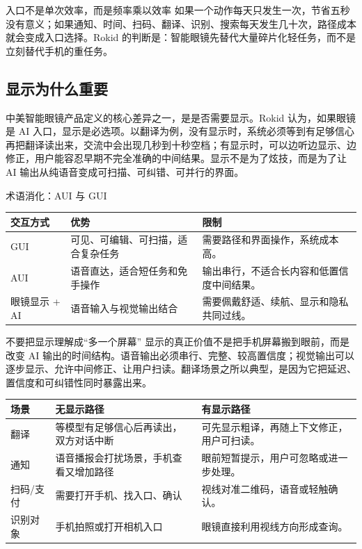 \begin{importantbox}{入口不是单次效率，而是频率乘以效率}
如果一个动作每天只发生一次，节省五秒没有意义；如果通知、时间、扫码、翻译、识别、搜索每天发生几十次，路径成本就会变成入口选择。Rokid 的判断是：智能眼镜先替代大量碎片化轻任务，而不是立刻替代手机的重任务。
\end{importantbox}

\subsection{显示为什么重要}

中美智能眼镜产品定义的核心差异之一，是是否需要显示。Rokid 认为，如果眼镜是 AI 入口，显示是必选项。以翻译为例，没有显示时，系统必须等到有足够信心再把翻译读出来，交流中会出现几秒到十秒空档；有显示时，可以边听边显示、边修正，用户能容忍早期不完全准确的中间结果。显示不是为了炫技，而是为了让 AI 输出从纯语音变成可扫描、可纠错、可并行的界面。

\begin{knowledgebox}{术语消化：AUI 与 GUI}
\noindent\begin{tabularx}{\textwidth}{p{}p{}X}
\toprule
交互方式 & 优势 & 限制 \\
\midrule
GUI & 可见、可编辑、可扫描，适合复杂任务 & 需要路径和界面操作，系统成本高。 \\
AUI & 语音直达，适合短任务和免手操作 & 输出串行，不适合长内容和低置信度中间结果。 \\
眼镜显示 + AI & 语音输入与视觉输出结合 & 需要佩戴舒适、续航、显示和隐私共同过线。 \\
\bottomrule
\end{tabularx}
\end{knowledgebox}

\begin{warningbox}{不要把显示理解成“多一个屏幕”}
显示的真正价值不是把手机屏幕搬到眼前，而是改变 AI 输出的时间结构。语音输出必须串行、完整、较高置信度；视觉输出可以逐步显示、允许中间修正、让用户扫读。翻译场景之所以典型，是因为它把延迟、置信度和可纠错性同时暴露出来。
\end{warningbox}

\noindent\begin{tabularx}{\textwidth}{p{}p{}X}
\toprule
场景 & 无显示路径 & 有显示路径 \\
\midrule
翻译 & 等模型有足够信心后再读出，双方对话中断 & 可先显示粗译，再随上下文修正，用户可扫读。 \\
通知 & 语音播报会打扰场景，手机查看又增加路径 & 眼前短暂提示，用户可忽略或进一步处理。 \\
扫码/支付 & 需要打开手机、找入口、确认 & 视线对准二维码，语音或轻触确认。 \\
识别对象 & 手机拍照或打开相机入口 & 眼镜直接利用视线方向形成查询。 \\
\bottomrule
\end{tabularx}

